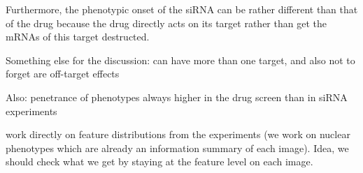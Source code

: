 Furthermore, the phenotypic onset of the siRNA can be rather different than that of the drug because the drug directly acts on its target rather than get the mRNAs of this target destructed.

Something else for the discussion: can have more than one target, and also not to forget are off-target effects

Also: penetrance of phenotypes always higher in the drug screen than in siRNA experiments

\cite{pmid18066055} work directly on feature distributions from the experiments (we work on nuclear phenotypes which are already an information summary of each image). Idea, we should check what we get by staying at the feature level on each image.
